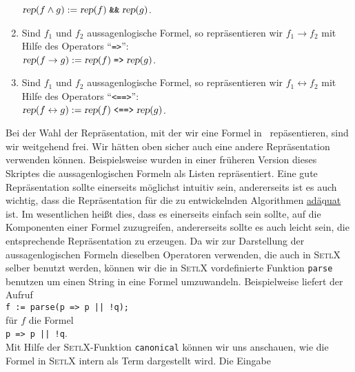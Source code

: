 \begin{enumerate}
      $\textsl{rep}(f \wedge g) := \textsl{rep}(f) \;\texttt{\&\&}\; \textsl{rep}(g)$.
\item Sind $f_1$ und $f_2$ aussagenlogische Formel, so repr\"{a}sentieren wir $f_1 \rightarrow f_2$ mit Hilfe
      des Operators  ``\texttt{=>}'': \\[0.2cm]
      \hspace*{1.3cm} 
      $\textsl{rep}(f \rightarrow g) := \textsl{rep}(f) \;\texttt{=>}\; \textsl{rep}(g)$.
\item Sind $f_1$ und $f_2$ aussagenlogische Formel, so repr\"{a}sentieren wir 
      $f_1 \leftrightarrow f_2$ mit Hilfe des Operators ``\texttt{<==>}'': \\[0.2cm] 
      \hspace*{1.3cm} 
      $\textsl{rep}(f \leftrightarrow g) := 
       \textsl{rep}(f) \;\texttt{<==>}\; \textsl{rep}(g)$.
\end{enumerate}
Bei der Wahl der Repr\"{a}sentation, mit der wir eine Formel in \setl\ rep\"{a}sentieren,
sind wir weitgehend frei.  Wir h\"{a}tten oben sicher auch eine andere Repr\"{a}sentation
verwenden k\"{o}nnen.  Beispielsweise wurden in einer fr\"{u}heren Version dieses Skriptes die
aussagenlogischen Formeln als Listen repr\"{a}sentiert.
Eine gute Repr\"{a}sentation sollte einerseits m\"{o}glichst intuitiv sein, andererseits ist
es auch wichtig, dass die Repr\"{a}sentation f\"{u}r die zu entwickelnden Algorithmen \underline{ad\"{a}}q\underline{uat}
ist.  Im wesentlichen hei\ss{}t dies, dass es einerseits einfach sein sollte, auf
die Komponenten einer Formel zuzugreifen, andererseits sollte es auch leicht sein,
die entsprechende Repr\"{a}sentation zu erzeugen.  Da wir zur Darstellung der
aussagenlogischen Formeln dieselben Operatoren verwenden, die auch in \textsc{SetlX} selber
benutzt werden, k\"{o}nnen wir die in \textsc{SetlX} vordefinierte Funktion \texttt{parse}
benutzen um einen String in eine Formel umzuwandeln.  Beispielweise liefert der Aufruf
\\[0.2cm]
\hspace*{1.3cm}
\texttt{f := parse(p => p || !q);}
\\[0.2cm]
f\"{u}r $f$ die Formel
\\[0.2cm]
\hspace*{1.3cm}
\texttt{p => p || !q}.
\\[0.2cm]
Mit Hilfe der \textsc{SetlX}-Funktion \texttt{canonical} k\"{o}nnen wir uns anschauen, wie die
Formel in \textsc{SetlX} intern als Term dargestellt wird.  Die Eingabe
\\[0.2cm]
